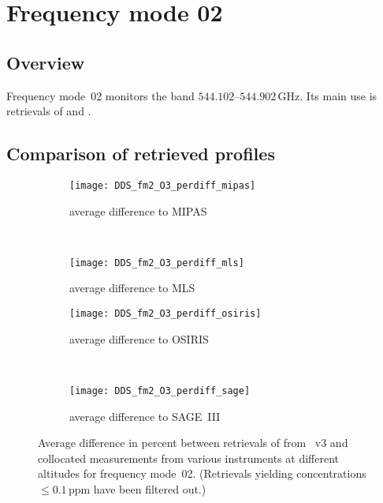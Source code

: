 \section{Frequency mode 02}
\label{sec:fm02}

\subsection{Overview}
\label{sec:fm02:overview}
Frequency mode~02 monitors the band $544.102$--$544.902\,\mathrm{GHz}$. Its
main use is retrievals of  and .


\subsection{Comparison of retrieved profiles}
\label{sec:fm02:comparison}



\begin{figure}[htpb]
    \centering
    \begin{subfigure}[b]{0.49\textwidth}
        \texttt{[image: DDS\_fm2\_O3\_perdiff\_mipas]}
        \caption{average difference to MIPAS}
        \label{fig:fm02:O3:profiles:MIPAS}
    \end{subfigure}
    \,
    \begin{subfigure}[b]{0.49\textwidth}
        \texttt{[image: DDS\_fm2\_O3\_perdiff\_mls]}
        \caption{average difference to MLS}
        \label{fig:fm02:O3:profiles:MLS}
    \end{subfigure}

    \begin{subfigure}[b]{0.49\textwidth}
        \texttt{[image: DDS\_fm2\_O3\_perdiff\_osiris]}
        \caption{average difference to OSIRIS}
        \label{fig:fm02:O3:profiles:OSIRIS}
    \end{subfigure}
    \,
    \begin{subfigure}[b]{0.49\textwidth}
        \texttt{[image: DDS\_fm2\_O3\_perdiff\_sage]}
        \caption{average difference to SAGE~III}
        \label{fig:fm02:O3:profiles:SAGEIII}
    \end{subfigure}
    \caption{Average difference in percent between retrievals of 
    from \smr~v3 and collocated measurements from various instruments at
    different altitudes for frequency mode~02. (Retrievals yielding
    concentrations $\leq 0.1\,\mathrm{ppm}$ have been filtered out.)}

    \label{fig:fm02:O3:profiles}
\end{figure}

